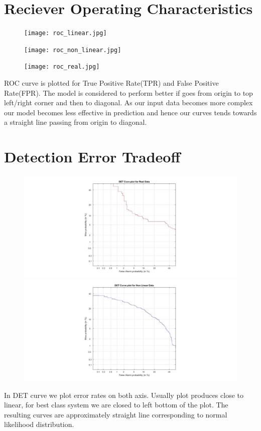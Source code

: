 \documentclass[12pt]{article}
\begin{document}
		\section{Reciever Operating Characteristics}
	\begin{figure}[H]
		\begin{minipage}{1.0\textwidth}
			\centering
			\texttt{[image: roc\_linear.jpg]}
		\end{minipage}\hfill
		\begin{minipage}{1.0\textwidth}
			\centering
			\texttt{[image: roc\_non\_linear.jpg]}
		\end{minipage}
		\begin{minipage}{1.0\textwidth}
			\centering
			\texttt{[image: roc\_real.jpg]}
		\end{minipage}
	\end{figure}
	ROC curve is plotted for True Positive Rate(TPR) and False Positive Rate(FPR). The model is considered to perform better if goes from origin to top left/right corner and then to diagonal. As our input data becomes more complex our model becomes less effective in prediction and hence our curves tends towards a straight line passing from origin to diagonal.
	
	\section{Detection Error Tradeoff}
	\begin{figure}[H]
		\begin{minipage}{1.0\textwidth}
			\centering
			\includegraphics[width=0.9\linewidth]{Det_real.jpg}
		\end{minipage}\hfill
		\begin{minipage}{1.0\textwidth}
			\centering
			\includegraphics[width=0.9\linewidth]{det_non_lin.jpg}
		\end{minipage}
	\end{figure}
	In DET curve we plot error rates on both axis. Usually plot produces close to linear, for best class system we are closed to left bottom of the plot. The resulting curves are approximately straight line corresponding to normal likelihood distribution.
\end{document}
